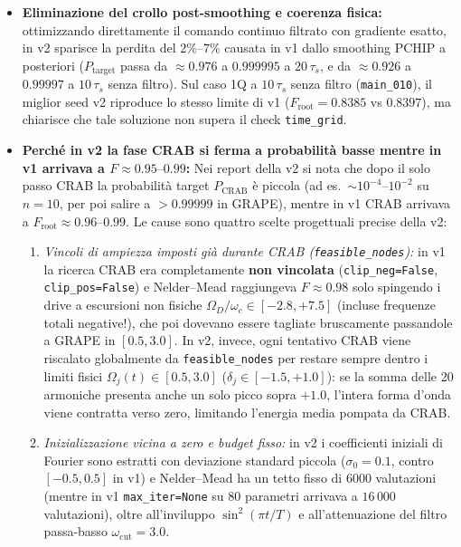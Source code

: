 \documentclass[11pt,a4paper]{article}
\begin{document}
\begin{itemize}
    \item \textbf{Eliminazione del crollo post-smoothing e coerenza fisica:} ottimizzando direttamente il comando continuo filtrato con gradiente esatto, in v2 sparisce la perdita del $2\%\text{--}7\%$ causata in v1 dallo smoothing PCHIP a posteriori ($P_{\text{target}}$ passa da $\approx 0.976$ a $0.999995$ a $20\,\tau_s$, e da $\approx 0.926$ a $0.99997$ a $10\,\tau_s$ senza filtro). Sul caso 1Q a $10\,\tau_s$ senza filtro (\texttt{main\_010}), il miglior seed v2 riproduce lo stesso limite di v1 ($F_{\text{root}} = 0.8385$ vs $0.8397$), ma chiarisce che tale soluzione non supera il check \texttt{time\_grid}.
    \item \textbf{Perché in v2 la fase CRAB si ferma a probabilità basse mentre in v1 arrivava a $F \approx 0.95\text{--}0.99$:}
    Nei report della v2 si nota che dopo il solo passo CRAB la probabilità target $P_{\text{CRAB}}$ è piccola (ad es.\ $\sim 10^{-4}\text{--}10^{-2}$ su $n=10$, per poi salire a $>0.99999$ in GRAPE), mentre in v1 CRAB arrivava a $F_{\text{root}} \approx 0.96\text{--}0.99$. Le cause sono quattro scelte progettuali precise della v2:
    \begin{enumerate}
        \item \emph{Vincoli di ampiezza imposti già durante CRAB (\texttt{feasible\_nodes}):} in v1 la ricerca CRAB era completamente \textbf{non vincolata} (\texttt{clip\_neg=False}, \texttt{clip\_pos=False}) e Nelder--Mead raggiungeva $F \approx 0.98$ solo spingendo i drive a escursioni non fisiche $\Omega_D/\omega_c \in [-2.8, +7.5]$ (incluse frequenze totali negative!), che poi dovevano essere tagliate bruscamente passandole a GRAPE in $[0.5, 3.0]$. In v2, invece, ogni tentativo CRAB viene riscalato globalmente da \texttt{feasible\_nodes} per restare sempre dentro i limiti fisici $\Omega_j(t) \in [0.5, 3.0]$ ($\delta_j \in [-1.5, +1.0]$): se la somma delle 20 armoniche presenta anche un solo picco sopra $+1.0$, l'intera forma d'onda viene contratta verso zero, limitando l'energia media pompata da CRAB.
        \item \emph{Inizializzazione vicina a zero e budget fisso:} in v2 i coefficienti iniziali di Fourier sono estratti con deviazione standard piccola ($\sigma_0 = 0.1$, contro $[-0.5, 0.5]$ in v1) e Nelder--Mead ha un tetto fisso di $6000$ valutazioni (mentre in v1 \texttt{max\_iter=None} su 80 parametri arrivava a $16\,000$ valutazioni), oltre all'inviluppo $\sin^2(\pi t/T)$ e all'attenuazione del filtro passa-basso $\omega_{\text{cut}}=3.0$.

\end{enumerate}
\end{itemize}
\end{document}
